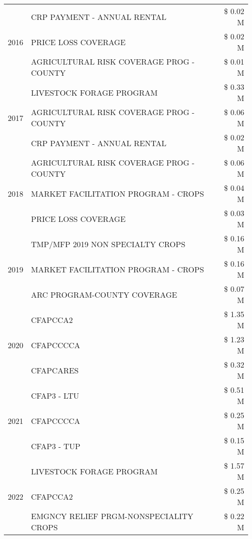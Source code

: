 \begin{tabular}{llr}
\cline{1-3}
\multirow[t]{3}{*}{2016} & CRP PAYMENT - ANNUAL RENTAL & \$ 0.02 M \\
 & PRICE LOSS COVERAGE & \$ 0.02 M \\
 & AGRICULTURAL RISK COVERAGE PROG - COUNTY & \$ 0.01 M \\
\cline{1-3}
\multirow[t]{3}{*}{2017} & LIVESTOCK FORAGE PROGRAM & \$ 0.33 M \\
 & AGRICULTURAL RISK COVERAGE PROG - COUNTY & \$ 0.06 M \\
 & CRP PAYMENT - ANNUAL RENTAL & \$ 0.02 M \\
\cline{1-3}
\multirow[t]{3}{*}{2018} & AGRICULTURAL RISK COVERAGE PROG - COUNTY & \$ 0.06 M \\
 & MARKET FACILITATION PROGRAM - CROPS & \$ 0.04 M \\
 & PRICE LOSS COVERAGE & \$ 0.03 M \\
\cline{1-3}
\multirow[t]{3}{*}{2019} & TMP/MFP 2019 NON SPECIALTY CROPS & \$ 0.16 M \\
 & MARKET FACILITATION PROGRAM - CROPS & \$ 0.16 M \\
 & ARC PROGRAM-COUNTY COVERAGE & \$ 0.07 M \\
\cline{1-3}
\multirow[t]{3}{*}{2020} & CFAPCCA2 & \$ 1.35 M \\
 & CFAPCCCCA & \$ 1.23 M \\
 & CFAPCARES & \$ 0.32 M \\
\cline{1-3}
\multirow[t]{3}{*}{2021} & CFAP3 - LTU & \$ 0.51 M \\
 & CFAPCCCCA & \$ 0.25 M \\
 & CFAP3 - TUP & \$ 0.15 M \\
\cline{1-3}
\multirow[t]{3}{*}{2022} & LIVESTOCK FORAGE PROGRAM & \$ 1.57 M \\
 & CFAPCCA2 & \$ 0.25 M \\
 & EMGNCY RELIEF PRGM-NONSPECIALITY CROPS & \$ 0.22 M \\
\cline{1-3}
\bottomrule
\end{tabular}
